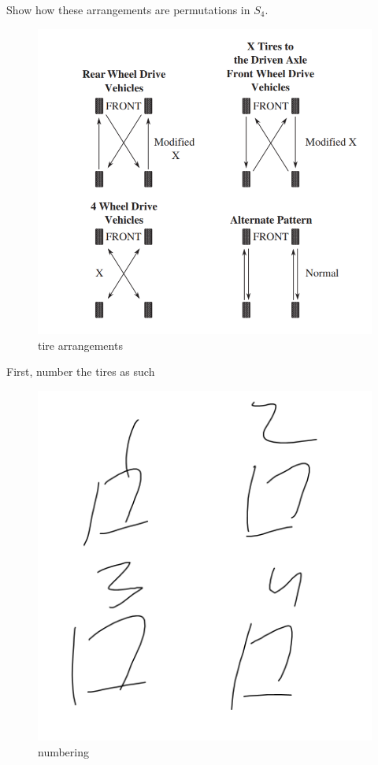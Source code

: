 \documentclass{article}
\begin{document}

Show how these arrangements are permutations in $S_4$.
\begin{figure}[htbp]
\centerline{\includegraphics[scale=0.5]{tires1.png}}
\caption{tire arrangements}
\label{fig}
\end{figure}
First, number the tires as such
\begin{figure}[htbp]
\centerline{\includegraphics[scale=0.1]{tires.png}}
\caption{numbering}
\label{fig}
\end{figure}
\end{document}
